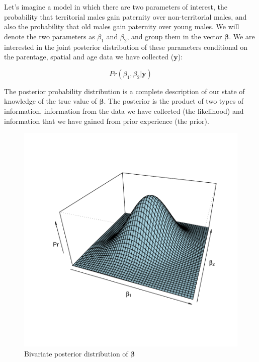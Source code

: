 \documentclass{article}
\begin{document}
Let's imagine a model in which there are two parameters of interest, the probability that territorial males gain paternity over non-territorial males, and also the probability that old males gain paternity over young males.  We will denote the two parameters as $\beta_{1}$ and  $\beta_{2}$, and group them in the vector $\bm{\beta}$.   We are interested in the joint posterior distribution of these parameters conditional on the parentage, spatial and age data we have collected ($\bm{y}$):

\begin{equation}
Pr(\beta_{1}, \beta_{2} | \bm{y})
\end{equation}

The posterior probability distribution is a complete description of our state of knowledge of the true value of $\bm{\beta}$. The posterior is the product of two types of information, information from the data we have collected (the likelihood) and information that we have gained from prior experience (the prior).\\  



\begin{figure}[!h]
\begin{center}
\includegraphics{Tutorial-006}
\end{center}
\caption{Bivariate posterior distribution of $\bm{\beta}$}
\label{densityP}
\end{figure}
\end{document}
